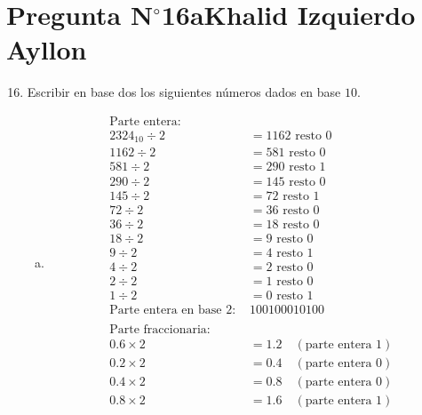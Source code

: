 \section{Pregunta N$^{\circ}$16a\qquad Khalid Izquierdo Ayllon}

\begin{frame}
	\begin{enumerate}\setcounter{enumi}{15}
		\item

		      Escribir en base dos los siguientes números dados en base $10$.


		      \begin{enumerate}[a)]
			      \item
                    \begin{align*}
			            \text{Parte entera: } & \\
			            2324_{10} \div 2 &= 1162 \text{ resto } 0 \\
			            1162 \div 2 &= 581 \text{ resto } 0 \\
			            581 \div 2 &= 290 \text{ resto } 1 \\
			            290 \div 2 &= 145 \text{ resto } 0 \\
			            145 \div 2 &= 72 \text{ resto } 1 \\
			            72 \div 2 &= 36 \text{ resto } 0 \\
			            36 \div 2 &= 18 \text{ resto } 0 \\
			            18 \div 2 &= 9 \text{ resto } 0 \\
			            9 \div 2 &= 4 \text{ resto } 1 \\
			            4 \div 2 &= 2 \text{ resto } 0 \\
			            2 \div 2 &= 1 \text{ resto } 0 \\
			            1 \div 2 &= 0 \text{ resto } 1 \\
			            \text{Parte entera en base 2: } & 100100010100 \\
			            \\
			            \text{Parte fraccionaria: } & \\
			            0.6 \times 2 &= 1.2 \quad (\text{parte entera 1}) \\
			            0.2 \times 2 &= 0.4 \quad (\text{parte entera 0}) \\
			            0.4 \times 2 &= 0.8 \quad (\text{parte entera 0}) \\
			            0.8 \times 2 &= 1.6 \quad (\text{parte entera 1}) \\

\end{align*}
\end{enumerate}
\end{enumerate}
\end{frame}

